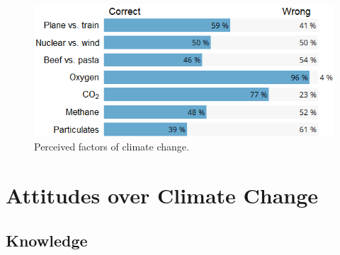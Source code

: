 \documentclass[english,5p,authoryear]{elsarticle}
\begin{document}
\begin{figure}[t]
\centering
\includegraphics[width=\columnwidth]{Images/CC_knowledge_valbtr.png}
\caption{Perceived factors of climate change.}
\label{fig:factors}
\end{figure}

\section{Attitudes over Climate Change\label{sec:attitudes_climate_change}}
    
    \subsection{Knowledge\label{subsec:knowledge}}
\end{document}
